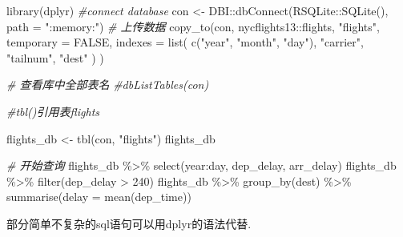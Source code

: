 \documentclass[
]{book}
\newenvironment{Shaded}{\begin{snugshade}}{\end{snugshade}}
\newcommand{\AttributeTok}[1]{\textcolor[rgb]{0.77,0.63,0.00}{#1}}
\newcommand{\CommentTok}[1]{\textcolor[rgb]{0.56,0.35,0.01}{\textit{#1}}}
\newcommand{\ConstantTok}[1]{\textcolor[rgb]{0.00,0.00,0.00}{#1}}
\newcommand{\DecValTok}[1]{\textcolor[rgb]{0.00,0.00,0.81}{#1}}
\newcommand{\FunctionTok}[1]{\textcolor[rgb]{0.00,0.00,0.00}{#1}}
\newcommand{\NormalTok}[1]{#1}
\newcommand{\OtherTok}[1]{\textcolor[rgb]{0.56,0.35,0.01}{#1}}
\newcommand{\SpecialCharTok}[1]{\textcolor[rgb]{0.00,0.00,0.00}{#1}}
\newcommand{\StringTok}[1]{\textcolor[rgb]{0.31,0.60,0.02}{#1}}
\begin{document}
\begin{Shaded}
\begin{Highlighting}[]
\FunctionTok{library}\NormalTok{(dplyr)}
\CommentTok{\#connect database}
\NormalTok{con }\OtherTok{\textless{}{-}}\NormalTok{ DBI}\SpecialCharTok{::}\FunctionTok{dbConnect}\NormalTok{(RSQLite}\SpecialCharTok{::}\FunctionTok{SQLite}\NormalTok{(), }\AttributeTok{path =} \StringTok{":memory:"}\NormalTok{)}
\CommentTok{\# 上传数据}
\FunctionTok{copy\_to}\NormalTok{(con, nycflights13}\SpecialCharTok{::}\NormalTok{flights, }\StringTok{"flights"}\NormalTok{,}
  \AttributeTok{temporary =} \ConstantTok{FALSE}\NormalTok{, }
  \AttributeTok{indexes =} \FunctionTok{list}\NormalTok{(}
    \FunctionTok{c}\NormalTok{(}\StringTok{"year"}\NormalTok{, }\StringTok{"month"}\NormalTok{, }\StringTok{"day"}\NormalTok{), }
    \StringTok{"carrier"}\NormalTok{, }
    \StringTok{"tailnum"}\NormalTok{,}
    \StringTok{"dest"}
\NormalTok{  )}
\NormalTok{)}

\CommentTok{\# 查看库中全部表名}
\CommentTok{\#dbListTables(con)}

\CommentTok{\#tbl()引用表flights}

\NormalTok{flights\_db }\OtherTok{\textless{}{-}} \FunctionTok{tbl}\NormalTok{(con, }\StringTok{"flights"}\NormalTok{)}
\NormalTok{flights\_db}

\CommentTok{\# 开始查询}
\NormalTok{flights\_db }\SpecialCharTok{\%\textgreater{}\%} \FunctionTok{select}\NormalTok{(year}\SpecialCharTok{:}\NormalTok{day, dep\_delay, arr\_delay)}
\NormalTok{flights\_db }\SpecialCharTok{\%\textgreater{}\%} \FunctionTok{filter}\NormalTok{(dep\_delay }\SpecialCharTok{\textgreater{}} \DecValTok{240}\NormalTok{)}
\NormalTok{flights\_db }\SpecialCharTok{\%\textgreater{}\%} 
  \FunctionTok{group\_by}\NormalTok{(dest) }\SpecialCharTok{\%\textgreater{}\%}
  \FunctionTok{summarise}\NormalTok{(}\AttributeTok{delay =} \FunctionTok{mean}\NormalTok{(dep\_time))}
\end{Highlighting}
\end{Shaded}

部分简单不复杂的sql语句可以用dplyr的语法代替.
\end{document}
